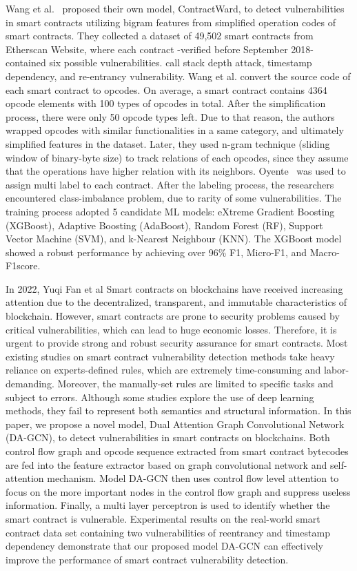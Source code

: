 Wang et al.~\cite{wang2020automated} proposed their own model, ContractWard, to detect vulnerabilities in smart contracts utilizing bigram features from simplified operation codes of smart contracts.
They collected a dataset of 49,502 smart contracts from Etherscan Website, where each contract -verified before September 2018- contained six possible vulnerabilities.
call stack depth attack, timestamp dependency, and re-entrancy vulnerability.
Wang et al. convert the source code of each smart contract to opcodes.
On average, a smart contract contains 4364 opcode elements with 100 types of opcodes in total.
After the simplification process, there were only 50 opcode types left.
Due to that reason, the authors wrapped opcodes with similar functionalities in a same category, and ultimately simplified features in the dataset.
Later, they used n-gram technique (sliding window of binary-byte size) to track relations of each opcodes, since they assume that the operations have higher relation with its neighbors.
Oyente~\cite{oyente} was used to assign multi label to each contract.
After the labeling process, the researchers encountered class-imbalance problem, due to rarity of some vulnerabilities.
The training process adopted 5 candidate ML models: eXtreme Gradient Boosting (XGBoost), Adaptive Boosting (AdaBoost), Random Forest (RF), Support Vector Machine (SVM), and k-Nearest Neighbour (KNN).
The XGBoost model showed a robust performance by achieving over 96\% F1, Micro-F1, and Macro-F1score.

In 2022, Yuqi Fan et al
Smart contracts on blockchains have received increasing attention due to the decentralized, transparent, and immutable characteristics of blockchain. However, smart contracts are prone to security problems caused by critical vulnerabilities, which can lead to huge economic losses. Therefore, it is urgent to provide strong and robust security assurance for smart contracts. Most existing studies on smart contract vulnerability detection methods take heavy reliance on experts-defined rules, which are extremely time-consuming and labor-demanding. Moreover, the manually-set rules are limited to specific tasks and subject to errors. Although some studies explore the use of deep learning methods, they fail to represent both semantics and structural information. In this paper, we propose a novel model, Dual Attention Graph Convolutional Network (DA-GCN), to detect vulnerabilities in smart contracts on blockchains. Both control flow graph and opcode sequence extracted from smart contract bytecodes are fed into the feature extractor based on graph convolutional network and self-attention mechanism. Model DA-GCN then uses control flow level attention to focus on the more important nodes in the control flow graph and suppress useless information. Finally, a multi layer perceptron is used to identify whether the smart contract is vulnerable. Experimental results on the real-world smart contract data set containing two vulnerabilities of reentrancy and timestamp dependency demonstrate that our proposed model DA-GCN can effectively improve the performance of smart contract vulnerability detection.





